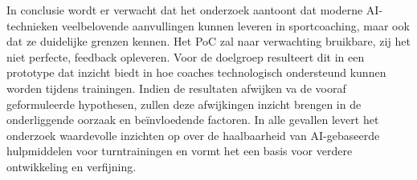 In conclusie wordt er verwacht dat het onderzoek aantoont dat moderne AI-technieken veelbelovende aanvullingen kunnen leveren in sportcoaching, maar ook dat ze duidelijke grenzen kennen. Het PoC zal naar verwachting bruikbare, zij het niet perfecte, feedback opleveren. Voor de doelgroep resulteert dit in een prototype dat inzicht biedt in hoe coaches technologisch ondersteund kunnen worden tijdens trainingen. Indien de resultaten afwijken va de vooraf geformuleerde hypothesen, zullen deze afwijkingen inzicht brengen in de onderliggende oorzaak en beïnvloedende factoren. In alle gevallen levert het onderzoek waardevolle inzichten op over de haalbaarheid van AI-gebaseerde hulpmiddelen voor turntrainingen en vormt het een basis voor verdere ontwikkeling en verfijning.

